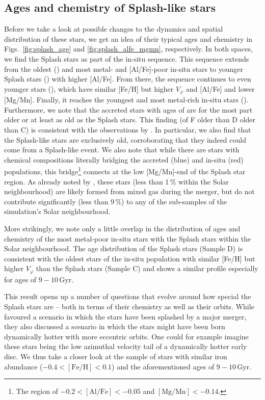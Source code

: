 \documentclass[fleqn,usenatbib]{mnras}
\begin{document}
\subsection{Ages and chemistry of Splash-like stars}

Before we take a look at possible changes to the dynamics and spatial distribution of these stars, we get an idea of their typical ages and chemistry in Figs.~\ref{fig:splash_age} and \ref{fig:splash_alfe_mgmn}, respectively. In both spaces, we find the Splash stars as part of the in-situ sequence. This sequence extends from the oldest  () and most metal- and [Al/Fe]-poor in-situ stars to younger Splash stars () with higher [Al/Fe]. From there, the sequence continues to even younger stars (), which have similar [Fe/H] but higher $V_\varphi$ and [Al/Fe] and lower [Mg/Mn]. Finally, it reaches the youngest and most metal-rich in-situ stars (). Furthermore, we note that the accreted stars with ages of  are for the most part older or at least as old as the Splash stars. This finding (of F older than D older than C) is consistent with the observations by \citet{Belokurov2020}. In particular, we also find that the Splash-like stars are exclusively old, corroborating that they indeed could come from a Splash-like event. We also note that while there are stars with chemical compositions literally bridging the accreted (blue) and in-situ (red) populations, this bridge\footnote{The region of $-0.2 < \mathrm{[Al/Fe]} < -0.05$ and $\mathrm{[Mg/Mn]} < -0.14$.} connects at the low [Mg/Mn]-end of the Splash star region. As already noted by \citet{Buder2024}, these stars  (less than 1\,\% within the Solar neighbourhood) are likely formed from mixed gas during the merger, but do not contribute significantly (less than 9\,\%) to any of the sub-samples of the simulation's Solar neighbourhood.

More strikingly, we note only a little overlap in the distribution of ages and chemistry of the most metal-poor in-situ stars with the Splash stars within the Solar neighbourhood. The age distribution of the Splash stars (Sample D) is consistent with the oldest stars of the in-situ population with similar [Fe/H] but higher $V_\varphi$ than the Splash stars (Sample C) and shows a similar profile especially for ages of $9-10\,\mathrm{Gyr}$.

This result opens up a number of questions that evolve around how special the Splash stars are -- both in terms of their chemistry as well as their orbits. While \citet{Belokurov2020} favoured a scenario in which the stars have been splashed by a major merger, they also discussed a scenario in which the stars might have been born dynamically hotter with more eccentric orbits. One could for example imagine these stars being the low azimuthal velocity tail of a dynamically hotter early disc. We thus take a closer look at the sample of stars with similar iron abundance ($-0.4 < \mathrm{[Fe/H]} < 0.1$) and the aforementioned ages of $9-10\,\mathrm{Gyr}$.
\end{document}
